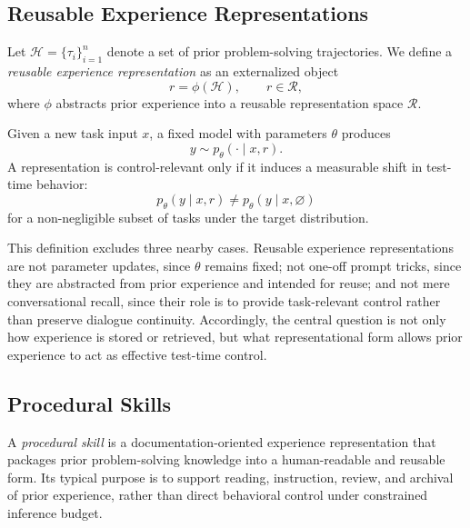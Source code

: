 \documentclass{article}
\begin{document}
\subsection{Reusable Experience Representations}
\label{sec:rer}

Let $\mathcal{H}=\{\tau_i\}_{i=1}^{n}$ denote a set of prior problem-solving trajectories. 
We define a \emph{reusable experience representation} as an externalized object
\begin{equation}
r=\phi(\mathcal{H}), \qquad r \in \mathcal{R},
\end{equation}
where $\phi$ abstracts prior experience into a reusable representation space $\mathcal{R}$.

Given a new task input $x$, a fixed model with parameters $\theta$ produces
\begin{equation}
y \sim p_{\theta}(\cdot \mid x, r).
\end{equation}
A representation is control-relevant only if it induces a measurable shift in test-time behavior:
\begin{equation}
p_{\theta}(y \mid x, r) \neq p_{\theta}(y \mid x, \varnothing)
\end{equation}
for a non-negligible subset of tasks under the target distribution.

This definition excludes three nearby cases. 
Reusable experience representations are not parameter updates, since $\theta$ remains fixed; not one-off prompt tricks, since they are abstracted from prior experience and intended for reuse; and not mere conversational recall, since their role is to provide task-relevant control rather than preserve dialogue continuity. 
Accordingly, the central question is not only how experience is stored or retrieved, but what representational form allows prior experience to act as effective test-time control.

\subsection{Procedural Skills}
\label{sec:skills}

A \emph{procedural skill} is a documentation-oriented experience representation that packages prior problem-solving knowledge into a human-readable and reusable form. 
Its typical purpose is to support reading, instruction, review, and archival of prior experience, rather than direct behavioral control under constrained inference budget.
\end{document}
